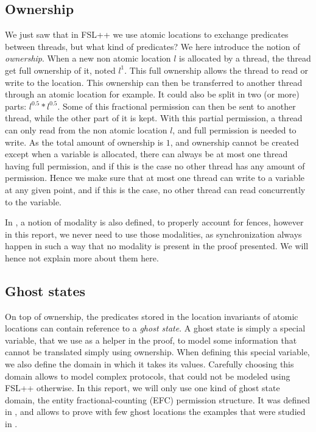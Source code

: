 \subsection{Ownership}
We just saw that in FSL++ we use atomic locations to exchange predicates between threads, but what kind of predicates? We here introduce the notion of \emph{ownership}. When a new non atomic location $l$ is allocated by a thread, the thread get full ownership of it, noted $l^1$. This full ownership allows the thread to read or write to the location. This ownership can then be transferred to another thread through an atomic location for example. It could also be split in two (or more) parts: $l^{0.5} * l^{0.5}$. Some of this fractional permission can then be sent to another thread, while the other part of it is kept. With this partial permission, a thread can only read from the non atomic location $l$, and full permission is needed to write. As the total amount of ownership is $1$, and ownership cannot be created except when a variable is allocated, there can always be at most one thread having full permission, and if this is the case no other thread has any amount of permission. Hence we make sure that at most one thread can write to a variable at any given point, and if this is the case, no other thread can read concurrently to the variable. 

In \cite{fsl}, a notion of modality is also defined, to properly account for fences, however in this report, we never need to use those modalities, as synchronization always happen in such a way that no modality is present in the proof presented. We will hence not explain more about them here.

\subsection{Ghost states}
On top of ownership, the predicates stored in the location invariants of atomic locations can contain reference to a \emph{ghost state}. A ghost state is simply a special variable, that we use as a helper in the proof, to model some information that cannot be translated simply using ownership. When defining this special variable, we also define the domain in which it takes its values. Carefully choosing this domain allows to model complex protocols, that could not be modeled using FSL++ otherwise. In this report, we will only use one kind of ghost state domain, the entity  fractional-counting (EFC) permission structure. It was defined in \cite{gaurav}, and allows to prove with few ghost locations the examples that were studied in \cite{gaurav}.

